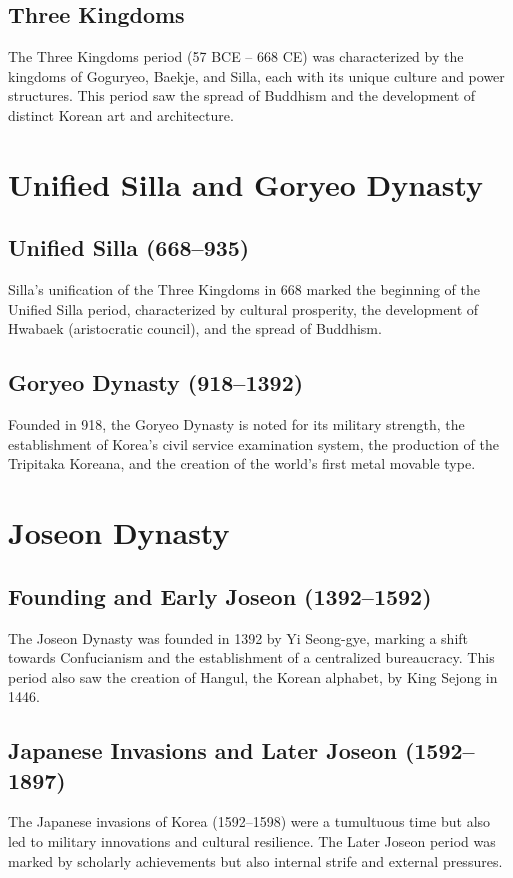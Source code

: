 \documentclass{book}
\begin{document}
\subsection{Three Kingdoms}
\label{subsec:three-kingdoms}
The Three Kingdoms period (57 BCE – 668 CE) was characterized by the kingdoms of Goguryeo, Baekje, and Silla, each with its unique culture and power structures. This period saw the spread of Buddhism and the development of distinct Korean art and architecture.

\section{Unified Silla and Goryeo Dynasty}
\label{sec:silla-goryeo}

\subsection{Unified Silla (668–935)}
\label{subsec:unified-silla}
Silla’s unification of the Three Kingdoms in 668 marked the beginning of the Unified Silla period, characterized by cultural prosperity, the development of Hwabaek (aristocratic council), and the spread of Buddhism.

\subsection{Goryeo Dynasty (918–1392)}
\label{subsec:goryeo-dynasty}
Founded in 918, the Goryeo Dynasty is noted for its military strength, the establishment of Korea’s civil service examination system, the production of the Tripitaka Koreana, and the creation of the world's first metal movable type.

\section{Joseon Dynasty}
\label{sec:joseon-dynasty}

\subsection{Founding and Early Joseon (1392–1592)}
\label{subsec:early-joseon}
The Joseon Dynasty was founded in 1392 by Yi Seong-gye, marking a shift towards Confucianism and the establishment of a centralized bureaucracy. This period also saw the creation of Hangul, the Korean alphabet, by King Sejong in 1446.

\subsection{Japanese Invasions and Later Joseon (1592–1897)}
\label{subsec:later-joseon}
The Japanese invasions of Korea (1592–1598) were a tumultuous time but also led to military innovations and cultural resilience. The Later Joseon period was marked by scholarly achievements but also internal strife and external pressures.
\end{document}
